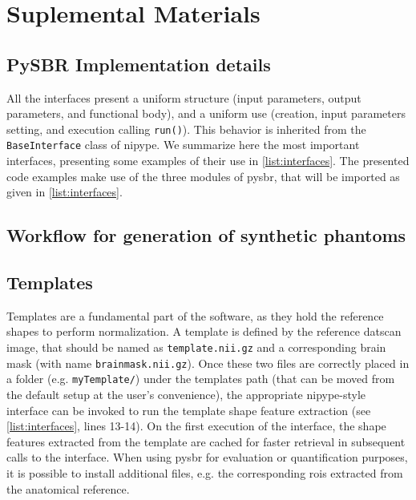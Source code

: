\documentclass{frontiers}
\newcommand{\fixme}[1]{}
\newcommand{\fixme}[1]{{\color{red}{\bf FIXME: }\emph{#1}}}
\begin{document}
\newpage
\appendix
\setcounter{page}{1}
\renewcommand*{\thepage}{Suplemental Material - \arabic{page}}
\section*{Suplemental Materials}\label{supl}

\subsection*{PySBR Implementation details}
\label{supl:implementation_details}

All the interfaces present a uniform structure (input parameters, output parameters,
  and functional body), and a uniform use (creation, input parameters setting, and
  execution calling \texttt{run()}).
This behavior is inherited from the \texttt{BaseInterface} class of \gls*{nipype}.
We summarize here the most important interfaces,
  presenting some examples of their use in \autoref{list:interfaces}.
The presented code examples make use of the three modules of 
  \gls*{pysbr}, that will be imported as given in \autoref{list:interfaces}.

\subsection*{Workflow for generation of synthetic phantoms}
\label{supl:synth_phantom_wf}
\fixme{here the workflow with some exemplary images}

\subsection*{Templates}
\label{supl:templates}
Templates are a fundamental part of the software, as they hold the reference shapes to
  perform normalization.
A template is defined by the reference \gls*{datscan} image, that
  should be named as \texttt{template.nii.gz} and a corresponding brain mask (with name
  \texttt{brainmask.nii.gz}).
Once these two files are correctly placed in a folder
  (e.g. \texttt{myTemplate/}) under the templates path (that can be moved from the
  default setup at the user's convenience), the appropriate \gls*{nipype}-style
  interface can be invoked to run the template shape feature extraction (see
  \autoref{list:interfaces}, lines 13-14).
On the first execution of the interface, the shape features extracted from
  the template are cached for faster retrieval in subsequent calls to the interface. 
When using \gls*{pysbr} for evaluation or quantification purposes, it is possible
  to install additional files, e.g. the corresponding \glspl*{roi} extracted
  from the anatomical reference.
\end{document}
